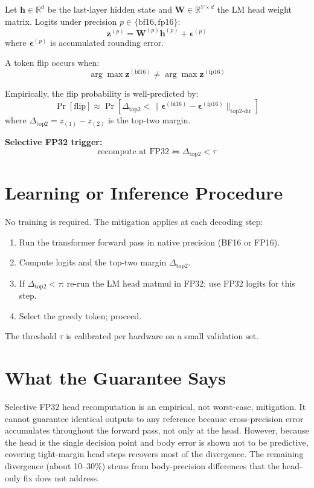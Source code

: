 \documentclass[10pt,twocolumn]{article}
\begin{document}
Let $\mathbf{h} \in \mathbb{R}^d$ be the last-layer hidden state and
$\mathbf{W} \in \mathbb{R}^{V \times d}$ the LM head weight matrix.
Logits under precision $p \in \{\mathrm{bf16}, \mathrm{fp16}\}$:
\[
\mathbf{z}^{(p)} = \mathbf{W}^{(p)} \mathbf{h}^{(p)} + \boldsymbol{\epsilon}^{(p)}
\]
where $\boldsymbol{\epsilon}^{(p)}$ is accumulated rounding error.

A token flip occurs when:
\[
\arg\max \mathbf{z}^{(\mathrm{bf16})} \neq \arg\max \mathbf{z}^{(\mathrm{fp16})}
\]

Empirically, the flip probability is well-predicted by:
\[
\Pr[\mathrm{flip}] \approx
  \Pr\!\left[\Delta_{\mathrm{top2}} <
    \bigl\|\boldsymbol{\epsilon}^{(\mathrm{bf16})} - \boldsymbol{\epsilon}^{(\mathrm{fp16})}
    \bigr\|_{\mathrm{top2\text{-}dir}}\right]
\]
where $\Delta_{\mathrm{top2}} = z_{(1)} - z_{(2)}$ is the top-two margin.

\textbf{Selective FP32 trigger:}
\[
\text{recompute at FP32} \iff \Delta_{\mathrm{top2}} < \tau
\]

\section{Learning or Inference Procedure}

No training is required. The mitigation applies at each decoding step:
\begin{enumerate}[itemsep=2pt,parsep=0pt]
  \item Run the transformer forward pass in native precision (BF16 or FP16).
  \item Compute logits and the top-two margin $\Delta_{\mathrm{top2}}$.
  \item If $\Delta_{\mathrm{top2}} < \tau$: re-run the LM head matmul in FP32;
    use FP32 logits for this step.
  \item Select the greedy token; proceed.
\end{enumerate}
The threshold $\tau$ is calibrated per hardware on a small validation set.

\section{What the Guarantee Says}

Selective FP32 head recomputation is an empirical, not worst-case, mitigation.
It cannot guarantee identical outputs to any reference because cross-precision
error accumulates throughout the forward pass, not only at the head. However,
because the head is the single decision point and body error is shown not to
be predictive, covering tight-margin head steps recovers most of the divergence.
The remaining divergence (about 10--30\%) stems from body-precision differences
that the head-only fix does not address.
\end{document}
